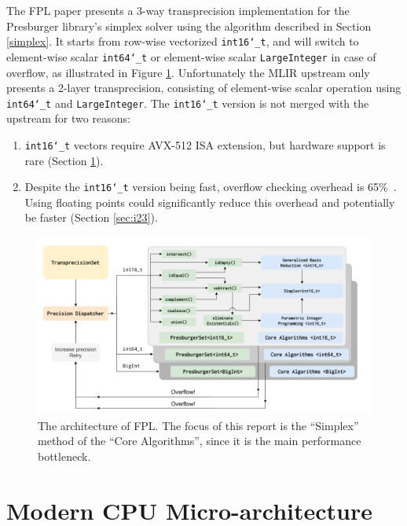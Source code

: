 \documentclass[logo,bsc,singlespacing,parskip]{infthesis}
\newcommand{\dtshort}{\texttt{int16\char`_t}}
\newcommand{\dtlong}{\texttt{int64\char`_t}}
\begin{document}
The FPL paper presents a 3-way transprecision implementation for the Presburger
library's simplex solver using the algorithm described in Section \ref{simplex}.
It starts from row-wise vectorized \dtshort{}, and will switch to  element-wise
scalar \dtlong{} or element-wise scalar \texttt{LargeInteger} in case of
overflow, as illustrated in Figure \ref{fig:fpl_arch}. Unfortunately the
MLIR upstream only presents a 2-layer transprecision, consisting of element-wise
scalar operation using \dtlong{} and \texttt{LargeInteger}. The \dtshort{}
version is not merged with the upstream for two reasons: 
\begin{enumerate} 
    \item \dtshort{} vectors require AVX-512 ISA extension, but hardware
    support is rare (Section \ref{sec:avx512}). 
    \item Despite the \dtshort{} version being fast, overflow checking overhead
    is 65\%~\cite{FPL2}. Using floating points could significantly reduce this
    overhead and potentially be faster (Section \ref{sec:i23}).  
\end{enumerate}


\begin{figure}
    \begin{center}
    \includegraphics[width=\linewidth]{image/transprecision.png}
    \caption{The architecture of FPL. The focus of this report is the
    ``Simplex'' method of the ``Core Algorithms'', since it is the main
    performance bottleneck.~\cite{FPL2}}
    \label{fig:fpl_arch}
    \end{center}
\end{figure}

\section{Modern CPU Micro-architecture}
\label{sec:avx512}
\end{document}
